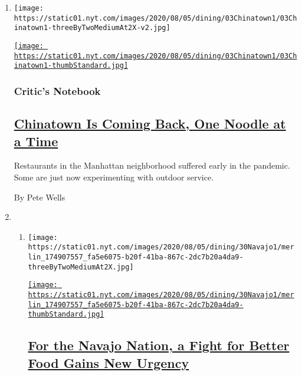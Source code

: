 \begin{enumerate}
\def\labelenumi{\arabic{enumi}.}
\item
  \texttt{[image: https://static01.nyt.com/images/2020/08/05/dining/03Chinatown1/03Chinatown1-threeByTwoMediumAt2X-v2.jpg]}

  \href{/2020/08/03/dining/chinatown-outdoor-dining-coronavirus.html}{\texttt{[image: https://static01.nyt.com/images/2020/08/05/dining/03Chinatown1/03Chinatown1-thumbStandard.jpg]}}

  \hypertarget{critics-notebook}{%
  \subsubsection{Critic's Notebook}\label{critics-notebook}}

  \hypertarget{chinatown-is-coming-back-one-noodle-at-a-time}{%
  \subsection{\texorpdfstring{\href{/2020/08/03/dining/chinatown-outdoor-dining-coronavirus.html}{Chinatown
  Is Coming Back, One Noodle at a
  Time}}{Chinatown Is Coming Back, One Noodle at a Time}}\label{chinatown-is-coming-back-one-noodle-at-a-time}}

  Restaurants in the Manhattan neighborhood suffered early in the
  pandemic. Some are just now experimenting with outdoor service.

  By Pete Wells
\item
  \begin{enumerate}
  \def\labelenumii{\arabic{enumii}.}
  \item
    \texttt{[image: https://static01.nyt.com/images/2020/08/05/dining/30Navajo1/merlin\_174907557\_fa5e6075-b20f-41ba-867c-2dc7b20a4da9-threeByTwoMediumAt2X.jpg]}

    \href{/2020/08/03/dining/navajo-nation-food-coronavirus.html}{\texttt{[image: https://static01.nyt.com/images/2020/08/05/dining/30Navajo1/merlin\_174907557\_fa5e6075-b20f-41ba-867c-2dc7b20a4da9-thumbStandard.jpg]}}

    \hypertarget{for-the-navajo-nation-a-fight-for-better-food-gains-new-urgency}{%
    \subsection{\texorpdfstring{\href{/2020/08/03/dining/navajo-nation-food-coronavirus.html}{For
    the Navajo Nation, a Fight for Better Food Gains New
    Urgency}}{For the Navajo Nation, a Fight for Better Food Gains New Urgency}}\label{for-the-navajo-nation-a-fight-for-better-food-gains-new-urgency}}


\end{enumerate}
\end{enumerate}
